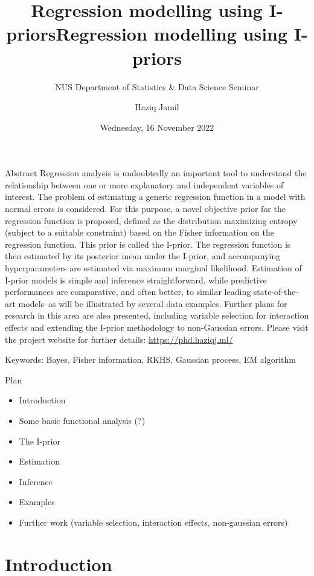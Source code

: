 \documentclass[,aspectratio=43]{beamer}
\author{Haziq Jamil}
\title{Regression modelling using I-priors}
\title{Regression modelling using I-priors}
\subtitle{NUS Department of Statistics \& Data Science Seminar}
\institute{Mathematical Sciences, Faculty of Science, UBD\\
\url{https://haziqj.ml}}
\date{Wednesday, 16 November 2022}
\providecommand{\tightlist}{%
  \setlength{\itemsep}{0pt}\setlength{\parskip}{0pt}}
\begin{document}
\begin{frame}
	\titlepage
\end{frame}


\begin{frame}{Abstract}
\protect\hypertarget{abstract}{}
Regression analysis is undoubtedly an important tool to understand the
relationship between one or more explanatory and independent variables
of interest. The problem of estimating a generic regression function in
a model with normal errors is considered. For this purpose, a novel
objective prior for the regression function is proposed, defined as the
distribution maximizing entropy (subject to a suitable constraint) based
on the Fisher information on the regression function. This prior is
called the I-prior. The regression function is then estimated by its
posterior mean under the I-prior, and accompanying hyperparameters are
estimated via maximum marginal likelihood. Estimation of I-prior models
is simple and inference straightforward, while predictive performances
are comparative, and often better, to similar leading state-of-the-art
models--as will be illustrated by several data examples. Further plans
for research in this area are also presented, including variable
selection for interaction effects and extending the I-prior methodology
to non-Gaussian errors. Please visit the project website for further
details: \url{https://phd.haziqj.ml/}

\vspace{1em}

Keywords: Bayes, Fisher information, RKHS, Gaussian process, EM
algorithm
\end{frame}

\begin{frame}{Plan}
\protect\hypertarget{plan}{}
\begin{itemize}
\tightlist
\item
  Introduction
\item
  Some basic functional analysis (?)
\item
  The I-prior
\item
  Estimation
\item
  Inference
\item
  Examples
\item
  Further work (variable selection, interaction effects, non-gaussian
  errors)
\end{itemize}
\end{frame}

\hypertarget{introduction}{%
\section{Introduction}\label{introduction}}
\end{document}
